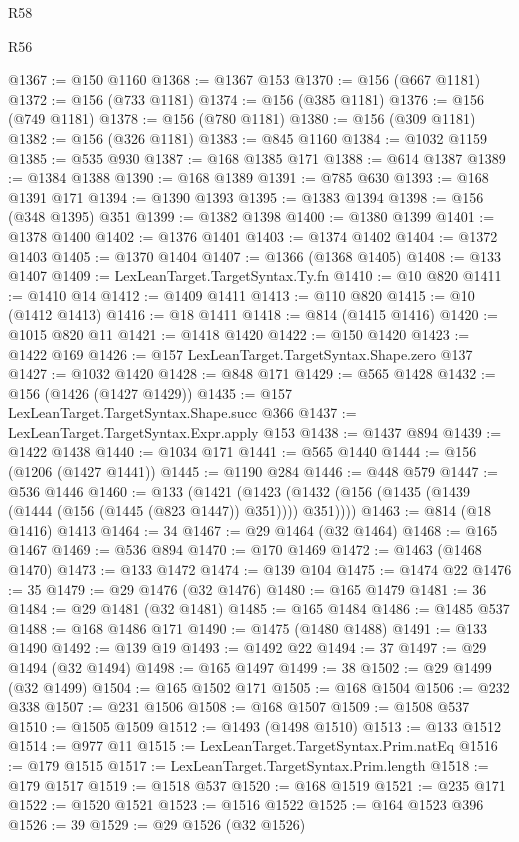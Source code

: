 \begin{lexlean}{R58}
\begin{lexlean}{R56}
\begin{coremodule}
{{{{{{{{{{{{{{{{{{{{{{{{{{{{{{{{{{{{{{{{{{{{{{{{{{{{{{{{{{{{{{{{{{{{{{{{{{{{{{{{{{{{{{{{{{{{{{{{{{{{{{{{{{{{{{{{{{{{{{{{{{{{{{{{{{{{{{{{{{{{{{{{{{{{{{{{{{{{{{{{{{{{{{{{{{{{{{{{{{{{{{{{{{{{{{{{{{{{{{{{{{{{{{{{{{{@1367 := @150 @1160
@1368 := @1367 @153
@1370 := @156 (@667 @1181)
@1372 := @156 (@733 @1181)
@1374 := @156 (@385 @1181)
@1376 := @156 (@749 @1181)
@1378 := @156 (@780 @1181)
@1380 := @156 (@309 @1181)
@1382 := @156 (@326 @1181)
@1383 := @845 @1160
@1384 := @1032 @1159
@1385 := @535 @930
@1387 := @168 @1385 @171
@1388 := @614 @1387
@1389 := @1384 @1388
@1390 := @168 @1389
@1391 := @785 @630
@1393 := @168 @1391 @171
@1394 := @1390 @1393
@1395 := @1383 @1394
@1398 := @156 (@348 @1395) @351
@1399 := @1382 @1398
@1400 := @1380 @1399
@1401 := @1378 @1400
@1402 := @1376 @1401
@1403 := @1374 @1402
@1404 := @1372 @1403
@1405 := @1370 @1404
@1407 := @1366 (@1368 @1405)
@1408 := @133 @1407
@1409 := LexLeanTarget.TargetSyntax.Ty.fn
@1410 := @10 @820
@1411 := @1410 @14
@1412 := @1409 @1411
@1413 := @110 @820
@1415 := @10 (@1412 @1413)
@1416 := @18 @1411
@1418 := @814 (@1415 @1416)
@1420 := @1015 @820 @11
@1421 := @1418 @1420
@1422 := @150 @1420
@1423 := @1422 @169
@1426 := @157 LexLeanTarget.TargetSyntax.Shape.zero @137
@1427 := @1032 @1420
@1428 := @848 @171
@1429 := @565 @1428
@1432 := @156 (@1426 (@1427 @1429))
@1435 := @157 LexLeanTarget.TargetSyntax.Shape.succ @366
@1437 := LexLeanTarget.TargetSyntax.Expr.apply @153
@1438 := @1437 @894
@1439 := @1422 @1438
@1440 := @1034 @171
@1441 := @565 @1440
@1444 := @156 (@1206 (@1427 @1441))
@1445 := @1190 @284
@1446 := @448 @579
@1447 := @536 @1446
@1460 := @133
    (@1421 (@1423 (@1432 (@156 (@1435 (@1439 (@1444 (@156 (@1445 (@823 @1447)) @351)))) @351))))
@1463 := @814 (@18 @1416) @1413
@1464 := 34
@1467 := @29 @1464 (@32 @1464)
@1468 := @165 @1467
@1469 := @536 @894
@1470 := @170 @1469
@1472 := @1463 (@1468 @1470)
@1473 := @133 @1472
@1474 := @139 @104
@1475 := @1474 @22
@1476 := 35
@1479 := @29 @1476 (@32 @1476)
@1480 := @165 @1479
@1481 := 36
@1484 := @29 @1481 (@32 @1481)
@1485 := @165 @1484
@1486 := @1485 @537
@1488 := @168 @1486 @171
@1490 := @1475 (@1480 @1488)
@1491 := @133 @1490
@1492 := @139 @19
@1493 := @1492 @22
@1494 := 37
@1497 := @29 @1494 (@32 @1494)
@1498 := @165 @1497
@1499 := 38
@1502 := @29 @1499 (@32 @1499)
@1504 := @165 @1502 @171
@1505 := @168 @1504
@1506 := @232 @338
@1507 := @231 @1506
@1508 := @168 @1507
@1509 := @1508 @537
@1510 := @1505 @1509
@1512 := @1493 (@1498 @1510)
@1513 := @133 @1512
@1514 := @977 @11
@1515 := LexLeanTarget.TargetSyntax.Prim.natEq
@1516 := @179 @1515
@1517 := LexLeanTarget.TargetSyntax.Prim.length
@1518 := @179 @1517
@1519 := @1518 @537
@1520 := @168 @1519
@1521 := @235 @171
@1522 := @1520 @1521
@1523 := @1516 @1522
@1525 := @164 @1523 @396
@1526 := 39
@1529 := @29 @1526 (@32 @1526)
}}}}}}}}}}}}}}}}}}}}}}}}}}}}}}}}}}}}}}}}}}}}}}}}}}}}}}}}}}}}}}}}}}}}}}}}}}}}}}}}}}}}}}}}}}}}}}}}}}}}}}}}}}}}}}}}}}}}}}}}}}}}}}}}}}}}}}}}}}}}}}}}}}}}}}}}}}}}}}}}}}}}}}}}}}}}}}}}}}}}}}}}}}}}}}}}}}}}}}}}}}}}}}}}}}}
\end{coremodule}
\end{lexlean}
\end{lexlean}
